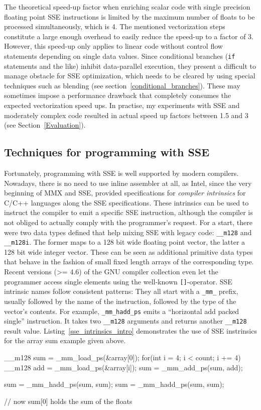 The theoretical speed-up factor when enriching scalar code with single precision floating point SSE instructions is limited by the maximum number of floats to be processed simultaneously, which is 4. The mentioned vectorization steps constitute a large enough overhead to easily reduce the speed-up to a factor of 3. However, this speed-up only applies to linear code without control flow statements depending on single data values. Since conditional branches (\texttt{if} statements and the like) inhibit data-parallel execution, they present a difficult to manage obstacle for SSE optimization, which needs to be cleared by using special techniques such as blending (see section~\ref{conditional_branches}). These may sometimes impose a performance drawback that completely consumes the expected vectorization speed ups. In practise, my experiments with SSE and moderately complex code resulted in actual speed up factors between 1.5 and 3 (see Section~\ref{Evaluation}).

\subsection{Techniques for programming with SSE}
Fortunately, programming with SSE is well supported by modern compilers. Nowadays, there is no need to use inline assembler at all, as Intel, since the very beginning of MMX and SSE, provided specifications for \emph{compiler intrinsics} for C/C++ languages along the SSE specifications. These intrinsics can be used to instruct the compiler to emit a specific SSE instruction, although the compiler is not obliged to actually comply with the programmer's request. For a start, there were two data types defined that help mixing SSE with legacy code: \texttt{\_\_m128} and \texttt{\_\_m128i}. The former maps to a 128 bit wide floating point vector, the latter a 128 bit wide integer vector. These can be seen as additional primitive data types that behave in the fashion of small fixed length arrays of the corresponding type. Recent versions (>= 4.6) of the GNU compiler collection even let the programmer access single elements using the well-known \texttt{[]}-operator. SSE intrinsic names follow consistent patterns: They all start with a \texttt{\_mm\_} prefix, usually followed by the name of the instruction, followed by the type of the vector's contents. For example, \texttt{\_mm\_hadd\_ps} emits a ``horizontal add packed single'' instruction. It takes two \texttt{\_\_m128} arguments and returns another \texttt{\_\_m128} result value. Listing~\ref{sse_intrinsics_intro} demonstrates the use of SSE instrinsics for the array sum example given above.
\begin{code}[caption={Array sum using SSE instrinsics}, label=sse_intrinsics_intro]
  __m128 sum = _mm_load_ps(&array[0]);
  for(int i = 4; i < count; i += 4) {
    __m128 add = _mm_load_ps(&array[i]);
    sum = _mm_add_ps(sum, add);
  }

  sum = _mm_hadd_ps(sum, sum);
  sum = _mm_hadd_ps(sum, sum);

  // now sum[0] holds the sum of the floats
\end{code}


